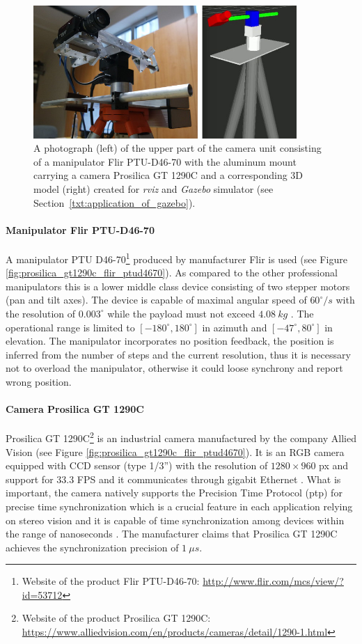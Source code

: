 \begin{figure}[tbh]
	\centering
	\includegraphics[width=10cm]{fig/camera_unit_photo_model.jpg}
	\caption{A photograph (left) of the upper part of the camera unit consisting of a manipulator Flir PTU-D46-70 with the aluminum mount carrying a camera Prosilica GT 1290C and a corresponding 3D model (right) created for \textit{rviz} and \textit{Gazebo} simulator (see Section~\ref{txt:application_of_gazebo}).}
	\label{fig:camera_unit_photo_model}
\end{figure}

\paragraph{Manipulator Flir PTU-D46-70} A manipulator PTU D46-70\footnote{Website of the product Flir PTU-D46-70: \url{http://www.flir.com/mcs/view/?id=53712}} produced by manufacturer Flir is used (see Figure \ref{fig:prosilica_gt1290c_flir_ptud4670}). As compared to the other professional manipulators this is a lower middle class device consisting of two stepper motors (pan and tilt axes). The device is capable of maximal angular speed of $60^{\circ}/s$ with the resolution of $0.003^{\circ}$ while the payload must not exceed $4.08~kg$ \cite{Flir_ptud4670}. The operational range is limited to $[-180^{\circ}, 180^{\circ}]$ in azimuth and $[-47^{\circ}, 80^{\circ}]$ in elevation. The manipulator incorporates no position feedback, the position is inferred from the number of steps and the current resolution, thus it is necessary not to overload the manipulator, otherwise it could loose synchrony and report wrong position.

\paragraph{Camera Prosilica GT 1290C} Prosilica GT 1290C\footnote{Website of the product Prosilica GT 1290C: \url{https://www.alliedvision.com/en/products/cameras/detail/1290-1.html}} is an industrial camera manufactured by the company Allied Vision (see Figure \ref{fig:prosilica_gt1290c_flir_ptud4670}). It is an RGB camera equipped with CCD sensor (type 1/3'') with the resolution of $1280 \times 960$ px and support for $33.3$ FPS and it communicates through gigabit Ethernet \cite{Prosilica_gt1290c}. What is important, the camera natively supports the Precision Time Protocol (\gls{ptp}) for precise time synchronization which is a crucial feature in each application relying on stereo vision and it is capable of time synchronization among devices within the range of nanoseconds \cite{PTP}. The manufacturer claims that Prosilica GT 1290C achieves the synchronization precision of $1~\mu s$.

